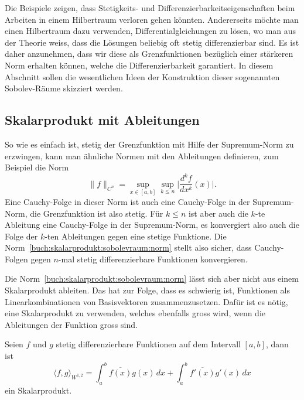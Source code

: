 Die Beispiele zeigen, dass Stetigkeits- und Differenzierbarkeitseigenschaften
beim Arbeiten in einem Hilbertraum verloren gehen könnten.
Andererseits möchte man einen Hilbertraum dazu verwenden,
Differentialgleichungen zu lösen, wo man aus der Theorie weiss, dass
die Lösungen beliebig oft stetig differenzierbar sind.
Es ist daher anzunehmen, dass wir diese als Grenzfunktionen bezüglich
einer stärkeren Norm erhalten können, welche die Differenzierbarkeit
garantiert.
In diesem Abschnitt sollen die wesentlichen Ideen der Konstruktion
dieser sogenannten Sobolev-Räume skizziert werden.

%
%
\subsection{Skalarprodukt mit Ableitungen}
So wie es einfach ist, stetig der Grenzfunktion mit Hilfe der Supremum-Norm
zu erzwingen, kann man ähnliche Normen mit den Ableitungen definieren, zum
Beispiel die Norm
\begin{equation}
\|f\|_{C^n}
=
\sup_{x\in [a,b]}\sup_{k\le n} \biggl|\frac{d^kf}{dx^k}(x)\biggr|.
\label{buch:skalarprodukt:sobolevraum:norm}
\end{equation}
Eine Cauchy-Folge in dieser Norm ist auch eine Cauchy-Folge in der
Supremum-Norm, die Grenzfunktion ist also stetig.
Für $k\le n$ ist aber auch die $k$-te Ableitung eine Cauchy-Folge
in der Supremum-Norm, es konvergiert also auch die Folge der $k$-ten
Ableitungen gegen eine stetige Funktione.
Die Norm~\eqref{buch:skalarprodukt:sobolevraum:norm} stellt also sicher,
dass Cauchy-Folgen gegen $n$-mal stetig differenzierbare Funktionen
konvergieren.

Die Norm~\eqref{buch:skalarprodukt:sobolevraum:norm} lässt sich aber
nicht aus einem Skalarprodukt ableiten.
Das hat zur Folge, dass es schwierig ist, Funktionen als Linearkombinationen
von Basisvektoren zusammenzusetzen.
Dafür ist es nötig, eine Skalarprodukt zu verwenden, welches ebenfalls
gross wird, wenn die Ableitungen der Funktion gross sind.

\begin{definition}
Seien $f$ und $g$ stetig differenzierbare Funktionen auf dem Intervall
$[a,b]$, dann ist
\begin{equation}
\langle f,g\rangle_{W^{1,2}}
=
\int_a^b \overline{f(x)} g(x)\,dx
+
\int_a^b \overline{f'(x)} g'(x)\,dx
\label{buch:skalarprodukt:sobolevraum:eqn:W12produkt}
\end{equation}
ein Skalarprodukt.
\end{definition}

